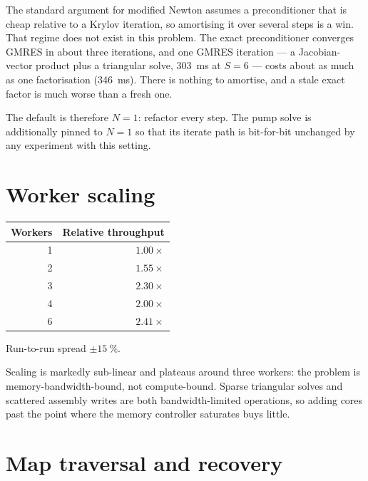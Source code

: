 \begin{remark}
The standard argument for modified Newton assumes a preconditioner that is
cheap relative to a Krylov iteration, so amortising it over several steps is a
win. That regime does not exist in this problem. The exact preconditioner
converges GMRES in about three iterations, and one GMRES iteration --- a
Jacobian-vector product plus a triangular solve, \SI{303}{\milli\second} at
$S=6$ --- costs about as much as one factorisation (\SI{346}{\milli\second}).
There is nothing to amortise, and a stale exact factor is much worse than a
fresh one.

The default is therefore $N=1$: refactor every step. The pump solve is
additionally pinned to $N=1$ so that its iterate path is bit-for-bit unchanged
by any experiment with this setting.
\end{remark}

\section{Worker scaling}

\begin{measured}[JTWPA $S=2$, six-core part]
\begin{center}
\begin{tabular}{@{}r r@{}}
\toprule
Workers & Relative throughput \\
\midrule
1 & $1.00\times$ \\
2 & $1.55\times$ \\
3 & $2.30\times$ \\
4 & $2.00\times$ \\
6 & $2.41\times$ \\
\bottomrule
\end{tabular}
\end{center}
Run-to-run spread $\pm\SI{15}{\percent}$.
\end{measured}

Scaling is markedly sub-linear and plateaus around three workers: the problem is
memory-bandwidth-bound, not compute-bound. Sparse triangular solves and
scattered assembly writes are both bandwidth-limited operations, so adding cores
past the point where the memory controller saturates buys little.

\section{Map traversal and recovery}

